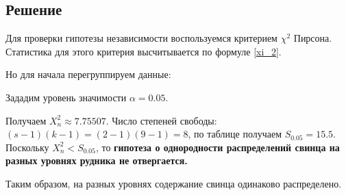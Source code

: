 \documentclass[12pt]{article}
\begin{document}
\vspace{1mm}


\subsection{Решение}

Для проверки гипотезы независимости воспользуемся критерием $\chi^2$ Пирсона. Статистика для этого критерия высчитывается по формуле \eqref{xi_2}.

Но для начала перегруппируем данные:


Зададим уровень значимости $\alpha = 0.05$.

Получаем $X_n^2 \approx 7.75507$. Число степеней свободы: $(s-1)(k-1)=(2-1)(9-1)=8$, по таблице получаем $S_{0.05} = 15.5$. Поскольку $X_n^2<S_{0.05}$, то \textbf{гипотеза о однородности распределений свинца на разных уровнях рудника не отвергается.}

Таким образом, на разных уровнях содержание свинца одинаково распределено.
\end{document}
